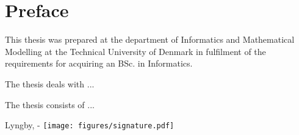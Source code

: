 \chapter{Preface}

This thesis was prepared at the department of Informatics and Mathematical Modelling at the Technical University of Denmark in fulfilment of the
requirements for acquiring an BSc. in Informatics. 

The thesis deals with ... 

The thesis consists of ...
\vspace{20mm}
\begin{center}
	\hspace{20mm} Lyngby, \thesishandin-\thesisyear 
	\vspace{5mm}
	\newline
	\texttt{[image: figures/signature.pdf]}
\end{center}
\begin{flushright}
	\thesisauthor
\end{flushright}
